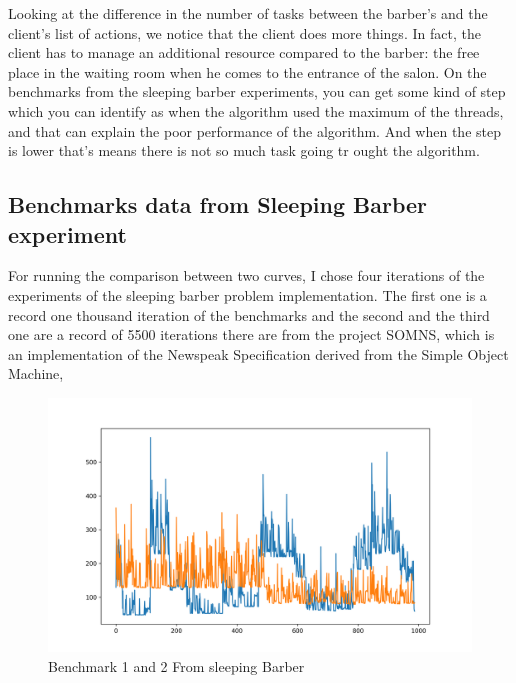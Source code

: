 \documentclass{article}
\begin{document}
Looking at the difference in the number of tasks between the barber's and the client's list of actions, we notice that the client does more things. In fact, the client has to manage an additional resource compared to the barber: the free place in the waiting room when he comes to the entrance of the salon. On the benchmarks from the sleeping barber experiments, you can get some kind of step which you can identify as when the algorithm used the maximum of the threads, and that can explain the poor performance of the algorithm. And when the step is lower that's means there is not so much task going tr ought the algorithm.

\subsection{Benchmarks data from Sleeping Barber experiment}

For running the comparison between two curves, I chose four iterations of the experiments of the sleeping barber problem implementation. The first one is a record one thousand iteration of the benchmarks and the second and the third one are a record of 5500 iterations there are from the project SOMNS, which is an implementation of the Newspeak Specification derived from the Simple Object Machine,

\begin{figure}[h!]
    \centering
    \includegraphics[width=1\textwidth]{plot_0.png}
    \caption{Benchmark 1 and 2 From sleeping Barber}
    \label{fig:bench_1_2}
\end{figure}
\end{document}
